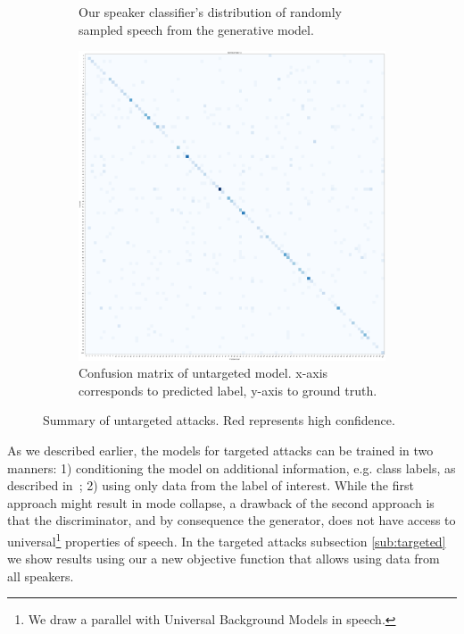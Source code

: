\begin{figure}[t]
\begin{subfigure}[b]{0.4\textwidth}
        \caption{Our speaker classifier's distribution of randomly sampled 
        speech from the generative model.}
        \label{fig:histogram_untargeted}
    \end{subfigure}
    \qquad
    \begin{subfigure}[b]{0.3\textwidth}
        \includegraphics[width=\textwidth]{./fig/conf_mat_cnn_knn.png}
        \caption{Confusion matrix of untargeted model. x-axis corresponds to predicted label, y-axis to ground truth.}
        \label{fig:conf_mat_untargeted}
    \end{subfigure}
    \caption{Summary of untargeted attacks. Red represents high confidence.}
    \label{fig:conf_mat_cnn_knn}
\end{figure}

As we described earlier, the models for targeted attacks can be trained in two manners: 1) 
conditioning the model on additional information, e.g. class labels, as
described in~\cite{mirza2014conditional}; 2) using only data from the label 
of interest. While the first approach might result in mode collapse, a drawback
of the second approach is that the discriminator, and by consequence the
generator, does not have access to universal\footnote{We draw a parallel with 
Universal Background Models in speech.} properties of speech. In the targeted 
attacks subsection \ref{sub:targeted} we show results using our a new objective function that allows 
using data from all speakers.  

